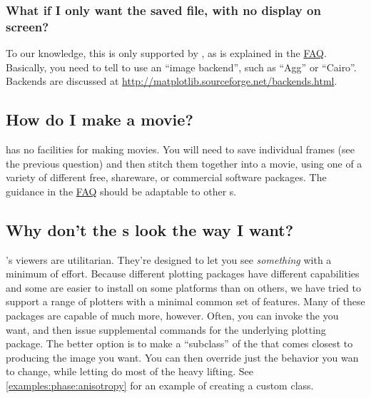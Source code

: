         \subsubsection{What if I only want the saved file, with no
        display on screen?} To our knowledge, this is only supported
        by \Matplotlib{}, as is explained in the
        \href{http://matplotlib.sourceforge.net/faq/howto_faq.html#generate-images-without-having-a-window-popup}{\Matplotlib{}
        FAQ}. Basically, you need to tell \Matplotlib{} to use an
        ``image backend'', such as ``Agg'' or ``Cairo''. Backends are
        discussed at
        \url{http://matplotlib.sourceforge.net/backends.html}.
        

    \subsection{How do I make a movie?} \FiPy{} has no facilities for 
    making movies. You will need to save individual frames (see the 
    previous question) and then stitch them together into a movie, 
    using one of a variety of different free, shareware, or 
    commercial software packages. The guidance in the 
    \href{http://matplotlib.sourceforge.net/faq/howto_faq.html#make-a-movie}{\Matplotlib{}
    FAQ} should be adaptable to other s.
    
    \subsection{Why don't the s look the way I want?}
    \FiPy's viewers are utilitarian. They're designed to let you see 
    \emph{something} with a minimum of effort. Because different 
    plotting packages have different capabilities and some are easier 
    to install on some platforms than on others, we have tried to 
    support a range of \Python{} plotters with a minimal common set of 
    features. Many of these packages are capable of much more, 
    however. Often, you can invoke the  you want, and 
    then issue supplemental commands for the underlying plotting 
    package. The better option is to make a ``subclass'' of the 
    \FiPy{}  that comes closest to producing the image 
    you want. You can then override just the behavior you wan to 
    change, while letting \FiPy{} do most of the heavy lifting. See 
    \ref{examples:phase:anisotropy} for an example of creating a custom 
    \Matplotlib{}  class.
    
